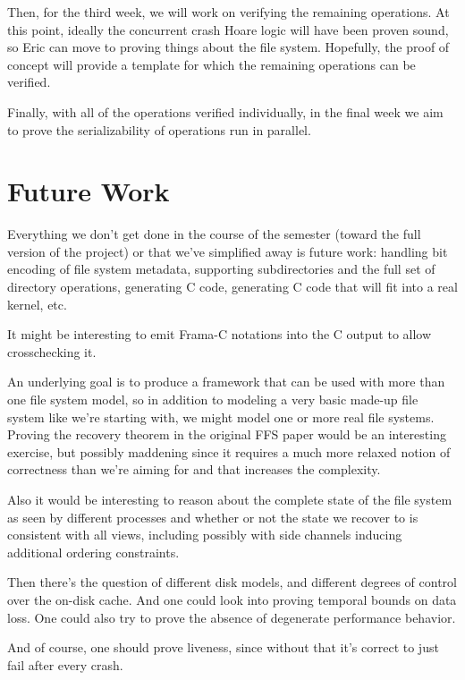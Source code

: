\documentclass[11pt, twocolumn, letterpaper]{article}
\begin{document}
Then, for the third week, we will work on verifying the remaining operations.
At this point, ideally the concurrent crash Hoare logic will have been proven
sound, so Eric can move to proving things about the file system. Hopefully, the
proof of concept will provide a template for which the remaining operations can
be verified.

Finally, with all of the operations verified individually, in the final week we
aim to prove the serializability of operations run in parallel.

\section{Future Work}


Everything we don't get done in the course of the semester (toward the
full version of the project) or that we've simplified away is future
work: handling bit encoding of file system metadata, supporting
subdirectories and the full set of directory operations, generating C
code, generating C code that will fit into a real kernel, etc.

It might be interesting to emit Frama-C notations into the C output to
allow crosschecking it.

An underlying goal is to produce a framework that can be
used with more than one file system model, so in addition to modeling
a very basic made-up file system like we're starting with, we might
model one or more real file systems.
Proving the recovery theorem in the original FFS paper would be an
interesting exercise, but possibly maddening since it requires a much
more relaxed notion of correctness than we're aiming for and that
increases the complexity.

Also it would be interesting to reason about the complete state of the
file system as seen by different processes and whether or not the
state we recover to is consistent with all views, including possibly
with side channels inducing additional ordering
constraints.

Then there's the question of different disk models, and different
degrees of control over the on-disk cache.
And one could look into proving temporal bounds on data loss.
One could also try to prove the absence of degenerate performance
behavior.

And of course, one should prove liveness, since without that it's
correct to just fail after every crash.

%
%
\end{document}
